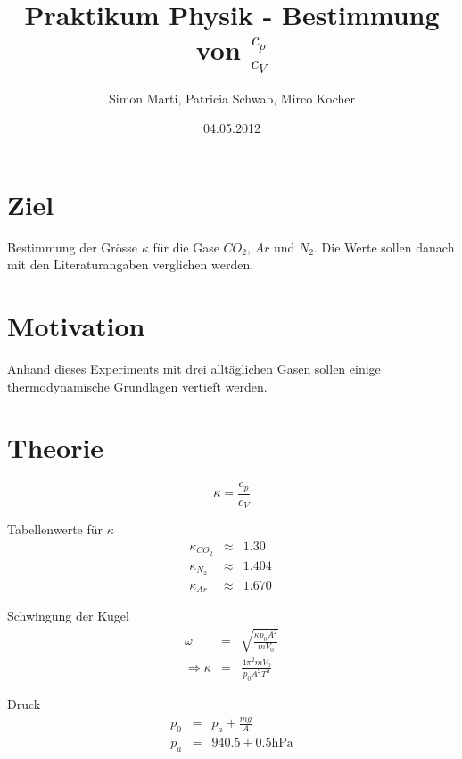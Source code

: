 \documentclass[12pt,a4paper]{article}
\title{Praktikum Physik - Bestimmung von $\frac{c_p}{c_V}$}
\author{Simon Marti, Patricia Schwab, Mirco Kocher}
\date{04.05.2012}
\begin{document}
\maketitle

\section*{Ziel}
Bestimmung der Gr\"osse $\kappa$ f\"ur die Gase $CO_2$, $Ar$ und $N_2$. Die Werte sollen danach mit den Literaturangaben verglichen werden.


\section*{Motivation}
Anhand dieses Experiments mit drei allt\"aglichen Gasen sollen einige thermodynamische Grundlagen vertieft werden.


\section*{Theorie}
\begin{equation}
\kappa = \frac{c_p}{c_V}
\end{equation}

Tabellenwerte f\"ur $\kappa $
\begin{eqnarray}
\kappa_{CO_2} & \approx & 1.30 \\
\kappa_{N_2} & \approx & 1.404 \\
\kappa_{Ar} & \approx & 1.670 \
\end{eqnarray}

Schwingung der Kugel
\begin{eqnarray}
\omega & = & \sqrt{\frac{\kappa p_0 A^2}{m V_0}} \\
\Rightarrow \kappa & = & \frac{4\pi ^2 m V_0}{p_0 A^2 T^2}\label{eq:k}
\end{eqnarray}

Druck
\begin{eqnarray}
p_0 & = & p_a + \frac{mg}{A} \\
p_a & = & 940.5 \pm 0.5 \mbox{hPa}
\end{eqnarray}
\end{document}
